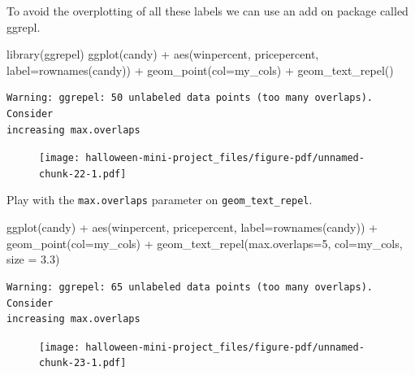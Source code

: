 \documentclass[
  letterpaper,
  DIV=11,
  numbers=noendperiod]{scrartcl}
\newenvironment{Shaded}{\begin{snugshade}}{\end{snugshade}}
\newcommand{\AttributeTok}[1]{\textcolor[rgb]{0.40,0.45,0.13}{#1}}
\newcommand{\DecValTok}[1]{\textcolor[rgb]{0.68,0.00,0.00}{#1}}
\newcommand{\FloatTok}[1]{\textcolor[rgb]{0.68,0.00,0.00}{#1}}
\newcommand{\FunctionTok}[1]{\textcolor[rgb]{0.28,0.35,0.67}{#1}}
\newcommand{\NormalTok}[1]{\textcolor[rgb]{0.00,0.23,0.31}{#1}}
\newcommand{\SpecialCharTok}[1]{\textcolor[rgb]{0.37,0.37,0.37}{#1}}
\begin{document}
To avoid the overplotting of all these labels we can use an add on
package called ggrepl.

\begin{Shaded}
\begin{Highlighting}[]
\FunctionTok{library}\NormalTok{(ggrepel)}
\FunctionTok{ggplot}\NormalTok{(candy) }\SpecialCharTok{+} 
  \FunctionTok{aes}\NormalTok{(winpercent, pricepercent, }\AttributeTok{label=}\FunctionTok{rownames}\NormalTok{(candy)) }\SpecialCharTok{+}
  \FunctionTok{geom\_point}\NormalTok{(}\AttributeTok{col=}\NormalTok{my\_cols) }\SpecialCharTok{+}
  \FunctionTok{geom\_text\_repel}\NormalTok{()}
\end{Highlighting}
\end{Shaded}

\begin{verbatim}
Warning: ggrepel: 50 unlabeled data points (too many overlaps). Consider
increasing max.overlaps
\end{verbatim}

\begin{figure}[H]

{\centering \texttt{[image: halloween-mini-project\_files/figure-pdf/unnamed-chunk-22-1.pdf]}

}

\end{figure}

Play with the \texttt{max.overlaps} parameter on
\texttt{geom\_text\_repel}.

\begin{Shaded}
\begin{Highlighting}[]
\FunctionTok{ggplot}\NormalTok{(candy) }\SpecialCharTok{+} 
  \FunctionTok{aes}\NormalTok{(winpercent, pricepercent, }\AttributeTok{label=}\FunctionTok{rownames}\NormalTok{(candy)) }\SpecialCharTok{+}
  \FunctionTok{geom\_point}\NormalTok{(}\AttributeTok{col=}\NormalTok{my\_cols) }\SpecialCharTok{+}
  \FunctionTok{geom\_text\_repel}\NormalTok{(}\AttributeTok{max.overlaps=}\DecValTok{5}\NormalTok{, }\AttributeTok{col=}\NormalTok{my\_cols, }\AttributeTok{size =} \FloatTok{3.3}\NormalTok{)}
\end{Highlighting}
\end{Shaded}

\begin{verbatim}
Warning: ggrepel: 65 unlabeled data points (too many overlaps). Consider
increasing max.overlaps
\end{verbatim}

\begin{figure}[H]

{\centering \texttt{[image: halloween-mini-project\_files/figure-pdf/unnamed-chunk-23-1.pdf]}

}

\end{figure}
\end{document}
